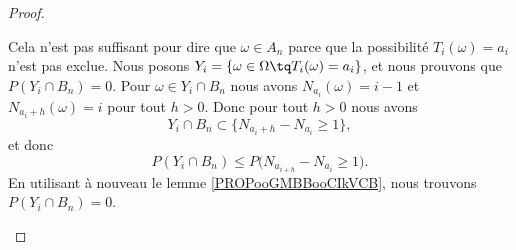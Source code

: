 \begin{proof}
\begin{subproof}
		Cela n'est pas suffisant pour dire que \( \omega\in A_n\) parce que la possibilité \( T_i(\omega)=a_i\) n'est pas exclue.
		Nous posons \( Y_i=\{ \omega\in \Omega\tq T_i(\omega)=a_i \}\), et nous prouvons que \( P(Y_i\cap B_n)=0\). Pour \( \omega\in Y_i\cap B_n\) nous avons \( N_{a_i}(\omega)=i-1\) et \( N_{a_i+h}(\omega)=i\) pour tout \( h>0\). Donc pour tout \( h>0\) nous avons
		\begin{equation}
			Y_i\cap B_n\subset\{ N_{a_i+h}-N_{a_i}\geq 1 \},
		\end{equation}
		et donc
		\begin{equation}
			P(Y_i\cap B_n)\leq P\big( N_{a_{i+h}}-N_{a_i}\geq 1 \big).
		\end{equation}
		En utilisant à nouveau le lemme \ref{PROPooGMBBooCIkVCB}, nous trouvons \( P(Y_i\cap B_n)=0\).


\end{subproof}
\end{proof}
